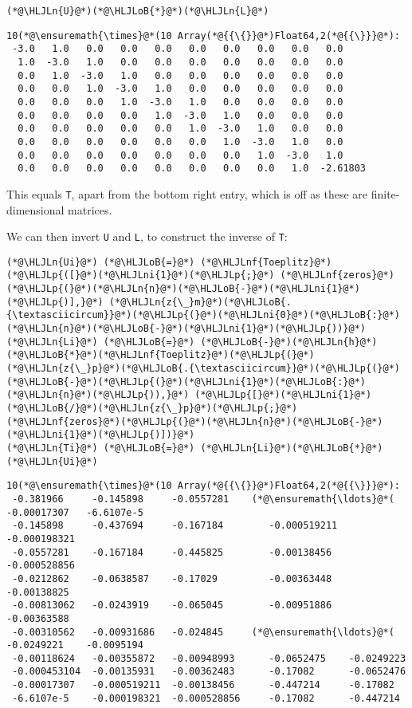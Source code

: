 \documentclass[12pt,landscape]{article}
\newcommand{\HLJLn}[1]{#1}
\newcommand{\HLJLnf}[1]{\textcolor[RGB]{66,102,213}{#1}}
\newcommand{\HLJLni}[1]{\textcolor[RGB]{59,151,46}{#1}}
\newcommand{\HLJLoB}[1]{\textcolor[RGB]{102,102,102}{\textbf{#1}}}
\newcommand{\HLJLp}[1]{#1}
\begin{document}
{\begin{lstlisting}
(*@\HLJLn{U}@*)(*@\HLJLoB{*}@*)(*@\HLJLn{L}@*)
\end{lstlisting}

\begin{lstlisting}
10(*@\ensuremath{\times}@*(10 Array(*@{{\{}}@*)Float64,2(*@{{\}}}@*):
 -3.0   1.0   0.0   0.0   0.0   0.0   0.0   0.0   0.0   0.0
  1.0  -3.0   1.0   0.0   0.0   0.0   0.0   0.0   0.0   0.0
  0.0   1.0  -3.0   1.0   0.0   0.0   0.0   0.0   0.0   0.0
  0.0   0.0   1.0  -3.0   1.0   0.0   0.0   0.0   0.0   0.0
  0.0   0.0   0.0   1.0  -3.0   1.0   0.0   0.0   0.0   0.0
  0.0   0.0   0.0   0.0   1.0  -3.0   1.0   0.0   0.0   0.0
  0.0   0.0   0.0   0.0   0.0   1.0  -3.0   1.0   0.0   0.0
  0.0   0.0   0.0   0.0   0.0   0.0   1.0  -3.0   1.0   0.0
  0.0   0.0   0.0   0.0   0.0   0.0   0.0   1.0  -3.0   1.0
  0.0   0.0   0.0   0.0   0.0   0.0   0.0   0.0   1.0  -2.61803
\end{lstlisting}


This equals \texttt{T}, apart from the bottom right entry, which is off as these are finite-dimensional matrices.

We can then invert \texttt{U} and \texttt{L}, to construct the inverse of \texttt{T}:


\begin{lstlisting}
(*@\HLJLn{Ui}@*) (*@\HLJLoB{=}@*) (*@\HLJLnf{Toeplitz}@*)(*@\HLJLp{([}@*)(*@\HLJLni{1}@*)(*@\HLJLp{;}@*) (*@\HLJLnf{zeros}@*)(*@\HLJLp{(}@*)(*@\HLJLn{n}@*)(*@\HLJLoB{-}@*)(*@\HLJLni{1}@*)(*@\HLJLp{)],}@*) (*@\HLJLn{z{\_}m}@*)(*@\HLJLoB{.{\textasciicircum}}@*)(*@\HLJLp{(}@*)(*@\HLJLni{0}@*)(*@\HLJLoB{:}@*)(*@\HLJLn{n}@*)(*@\HLJLoB{-}@*)(*@\HLJLni{1}@*)(*@\HLJLp{))}@*)
(*@\HLJLn{Li}@*) (*@\HLJLoB{=}@*) (*@\HLJLoB{-}@*)(*@\HLJLn{h}@*)(*@\HLJLoB{*}@*)(*@\HLJLnf{Toeplitz}@*)(*@\HLJLp{(}@*)(*@\HLJLn{z{\_}p}@*)(*@\HLJLoB{.{\textasciicircum}}@*)(*@\HLJLp{(}@*)(*@\HLJLoB{-}@*)(*@\HLJLp{(}@*)(*@\HLJLni{1}@*)(*@\HLJLoB{:}@*)(*@\HLJLn{n}@*)(*@\HLJLp{)),}@*) (*@\HLJLp{[}@*)(*@\HLJLni{1}@*)(*@\HLJLoB{/}@*)(*@\HLJLn{z{\_}p}@*)(*@\HLJLp{;}@*) (*@\HLJLnf{zeros}@*)(*@\HLJLp{(}@*)(*@\HLJLn{n}@*)(*@\HLJLoB{-}@*)(*@\HLJLni{1}@*)(*@\HLJLp{)])}@*)
(*@\HLJLn{Ti}@*) (*@\HLJLoB{=}@*) (*@\HLJLn{Li}@*)(*@\HLJLoB{*}@*)(*@\HLJLn{Ui}@*)
\end{lstlisting}

\begin{lstlisting}
10(*@\ensuremath{\times}@*(10 Array(*@{{\{}}@*)Float64,2(*@{{\}}}@*):
 -0.381966     -0.145898     -0.0557281    (*@\ensuremath{\ldots}@*(  -0.00017307   -6.6107e-5
 -0.145898     -0.437694     -0.167184        -0.000519211  -0.000198321
 -0.0557281    -0.167184     -0.445825        -0.00138456   -0.000528856
 -0.0212862    -0.0638587    -0.17029         -0.00363448   -0.00138825
 -0.00813062   -0.0243919    -0.065045        -0.00951886   -0.00363588
 -0.00310562   -0.00931686   -0.024845     (*@\ensuremath{\ldots}@*(  -0.0249221    -0.0095194
 -0.00118624   -0.00355872   -0.00948993      -0.0652475    -0.0249223
 -0.000453104  -0.00135931   -0.00362483      -0.17082      -0.0652476
 -0.00017307   -0.000519211  -0.00138456      -0.447214     -0.17082
 -6.6107e-5    -0.000198321  -0.000528856     -0.17082      -0.447214
\end{lstlisting}


}
\end{document}
